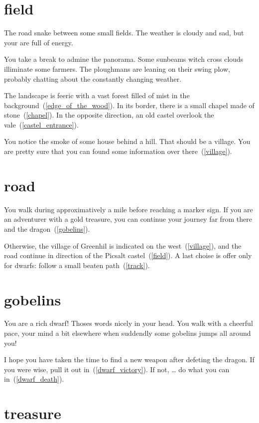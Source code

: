 
\section{field}

The road snake between some small fields. The weather is cloudy and sad, but
your are full of energy.

You take a break to admine the panorama. Some sunbeams witch cross clouds
illiminate some farmers. The ploughmans are leaning on their swing plow,
probably chatting about the constantly changing weather.

The landscape is feeric with a vast forest filled of mist in the
background~(\ref{edge_of_the_wood}). In its border, there is a small chapel made
of stone~(\ref{chapel}). In the opposite direction, an old castel overlook the
vale~(\ref{castel_entrance}).

You notice the smoke of some house behind a hill. That should be a village. You
are pretty sure that you can found some information over there~(\ref{village}).

\section{road}

You walk during approximatively a mile before reaching a marker sign. If you are
an adventurer with a gold treasure, you can continue your journey far from there and
the dragon~(\ref{gobelins}).

Otherwise, the village of Greenhil is indicated on the west~(\ref{village}), and
the road continue in direction of the Picsalt castel~(\ref{field}). A last
choise is offer only for dwarfs: follow a small beaten path~(\ref{track}).

\section{gobelins}

You are a rich dwarf! Thoses words nicely in your head. You walk with a cheerful
pace, your mind a bit elsewhere when suddendly some gobelins jumps all around
you!

I hope you have taken the time to find a new weapon after defeting the dragon. If
you were wise, pull it out in~(\ref{dwarf_victory}). If not, … do what you can
in~(\ref{dwarf_death}).

\section{treasure}

